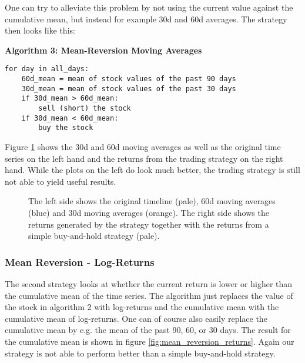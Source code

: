 One can try to alleviate this problem by not using the current value against the cumulative mean, but instead for example 30d and 60d averages. The strategy then looks like this: 

\vspace{2ex}
\textbf{\small{Algorithm 3: Mean-Reversion Moving Averages}}
\vspace{-1ex}
\begin{verbatim}
for day in all_days: 
    60d_mean = mean of stock values of the past 90 days
    30d_mean = mean of stock values of the past 30 days
    if 30d_mean > 60d_mean:
        sell (short) the stock
    if 30d_mean < 60d_mean:
        buy the stock
\end{verbatim}

Figure \ref{fig:30d_60d_plot} shows the 30d and 60d moving averages as well as the original time series on the left hand and the returns from the trading strategy on the right hand. While the plots on the left do look much better, the trading strategy is still not able to yield useful results. 

\begin{figure}[h!]
    \centering
    \begin{minipage}[b]{0.49\textwidth}
        \centering
            \begin{adjustbox}{width=\textwidth,center}
               
            \end{adjustbox}
    \end{minipage}
    \hfill
    \begin{minipage}[b]{0.49\textwidth}
        \centering
        \begin{adjustbox}{width=\textwidth,center, scale={1}{1.2}}
            
        \end{adjustbox}
    \end{minipage}
    \caption{The left side shows the original timeline (pale), 60d moving averages (blue) and 30d moving averages (orange). The right side shows the returns generated by the strategy together with the returns from a simple buy-and-hold strategy (pale).}
    \label{fig:30d_60d_plot}
\end{figure}{}

\subsubsection{Mean Reversion - Log-Returns}
The second strategy looks at whether the current return is lower or higher than the cumulative mean of the time series. The algorithm just replaces the value of the stock in algorithm 2 with log-returns and the cumulative mean with the cumulative mean of log-returns. One can of course also easily replace the cumulative mean by e.g. the mean of the past 90, 60, or 30 days. The result for the cumulative mean is shown in figure \ref{fig:mean_reversion_returns}. Again our strategy is not able to perform better than a simple buy-and-hold strategy. 

